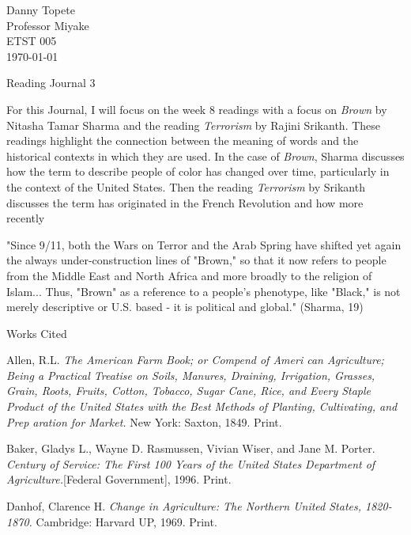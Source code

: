 \documentclass[12pt]{article}
\newcommand{\bibent}{\noindent \hangindent 40pt}
\newenvironment{workscited}{\newpage \begin{center} Works Cited \end{center}}{\newpage }
\begin{document}
\begin{flushleft}

Danny Topete\\
Professor Miyake\\
ETST 005\\
\today\\


\begin{center}
Reading Journal 3
\end{center}


\setlength{\parindent}{0.5in}

For this Journal, I will focus on the week 8 readings with a focus on \textit{Brown} by Nitasha Tamar Sharma
and the reading \textit{Terrorism} by Rajini Srikanth. These readings highlight the connection between
the meaning of words and the historical contexts in which they are used.
In the case of \textit{Brown}, Sharma discusses how the term
to describe people of color has changed over time, particularly in the context of the United States.
Then the reading \textit{Terrorism} by Srikanth discusses the term has originated in the French Revolution and how more recently

"Since 9/11, both the Wars on Terror and the Arab Spring have shifted
yet again the always under-construction lines of "Brown," so that it now
refers to people from the Middle East and North Africa and more broadly to the religion of Islam...
Thus, "Brown" as a reference to a people's phenotype, like "Black," is not merely descriptive or U.S. based - it
is political and global." (Sharma, 19)


\newpage


\begin{workscited}

\bibent
Allen, R.L. \textit{The American Farm Book; or Compend of Ameri can Agriculture; Being a Practical Treatise on Soils, Manures, Draining, Irrigation, Grasses, Grain, Roots, Fruits, Cotton, Tobacco, Sugar Cane, Rice, and Every Staple Product of the United States with the Best Methods of Planting, Cultivating, and Prep aration for Market.} New York: Saxton, 1849. Print.

\bibent
Baker, Gladys L., Wayne D. Rasmussen, Vivian Wiser, and Jane M. Porter. \textit{Century of Service: The First 100 Years of the United States Department of Agriculture.}[Federal Government], 1996. Print.

\bibent
Danhof, Clarence H. \textit{Change in Agriculture: The Northern United States, 1820-1870.} Cambridge: Harvard UP, 1969. Print.


\end{workscited}

\end{flushleft}
\end{document}

